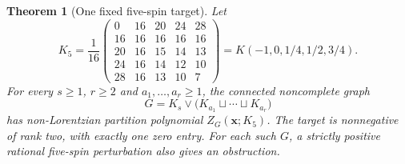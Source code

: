 \documentclass[11pt]{article}
\newtheorem{theorem}{Theorem}
\theoremstyle{remark}
\begin{document}
\begin{theorem}[One fixed five-spin target]\label{thm:clusterjoin}
Let
\begin{equation}
 K_5=\frac1{16}
 \begin{pmatrix}
 0&16&20&24&28\\
 16&16&16&16&16\\
 20&16&15&14&13\\
 24&16&14&12&10\\
 28&16&13&10&7
 \end{pmatrix}
 =K(-1,0,1/4,1/2,3/4).                              \label{eq:fixedfive}
\end{equation}
For every $s\geq1$, $r\geq2$ and $a_1,\ldots,a_r\geq1$, the
connected noncomplete graph
\[
 G=K_s\vee\bigl(K_{a_1}\sqcup\cdots\sqcup K_{a_r}\bigr)
\]
has non-Lorentzian partition polynomial $Z_G(\mathbf x;K_5)$.
The target is nonnegative of rank two, with exactly one zero entry.
For each such $G$, a strictly positive rational five-spin
perturbation also gives an obstruction.
\end{theorem}
\end{document}
